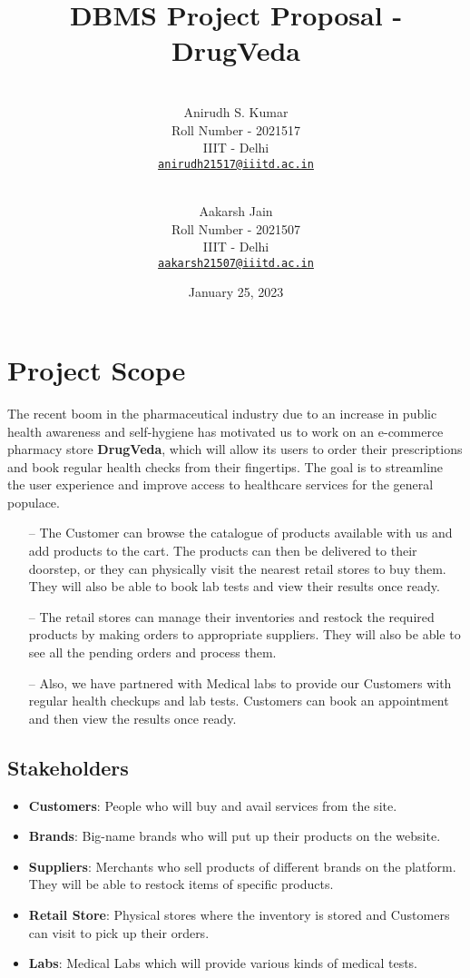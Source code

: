 \documentclass{article}
\title{DBMS Project Proposal - DrugVeda}
\author{
    \\\vspace{0em} Anirudh S. Kumar \\\vspace{-0.5em}
    \footnotesize{Roll Number - 2021517}\\\vspace{-0.5em}
    \footnotesize{IIIT - Delhi}\\\vspace{-0.5em}
    \footnotesize{\href{mailto:anirudh21517@iiitd.ac.in}{\texttt{anirudh21517@iiitd.ac.in}}}
  \and
    \\\vspace{0em} Aakarsh Jain \\\vspace{-0.5em}
    \footnotesize{Roll Number - 2021507}\\\vspace{-0.5em}
    \footnotesize{IIIT - Delhi}\\\vspace{-0.5em}
    \footnotesize{\href{mailto:aakarsh21507@iiitd.ac.in}{\texttt{aakarsh21507@iiitd.ac.in}}} 
    \vspace{1em}
}
\date{January 25, 2023}
\begin{document}
\maketitle

\section{Project Scope}

The recent boom in the pharmaceutical industry due to an increase in public health awareness and self-hygiene has motivated us to work on an e-commerce pharmacy store \textbf{DrugVeda}, which will allow its users to order their prescriptions and book regular health checks from their fingertips. The goal is to streamline the user experience and improve access to healthcare services for the general populace.

\begin{itemize}
    \item[--] The Customer can browse the catalogue of products available with us and add products to the cart. The products can then be delivered to their doorstep, or they can physically visit the nearest retail stores to buy them. They will also be able to book lab tests and view their results once ready.

    \item[--] The retail stores can manage their inventories and restock the required products by making orders to appropriate suppliers. They will also be able to see all the pending orders and process them. 

    \item[--] Also, we have partnered with Medical labs to provide our Customers with regular health checkups and lab tests. Customers can book an appointment and then view the results once ready.

\end{itemize}




\subsection{Stakeholders}
\begin{itemize}
    \item \textbf{Customers}: People who will buy and avail services from the site.
    \item \textbf{Brands}: Big-name brands who will put up their products on the website. 
    \item \textbf{Suppliers}: Merchants who sell products of different brands on the platform. They will be able to restock items of specific products.
    \item \textbf{Retail Store}: Physical stores where the inventory is stored and Customers can visit to pick up their orders.
    \item \textbf{Labs}: Medical Labs which will provide various kinds of medical tests.
\end{itemize}
\end{document}
